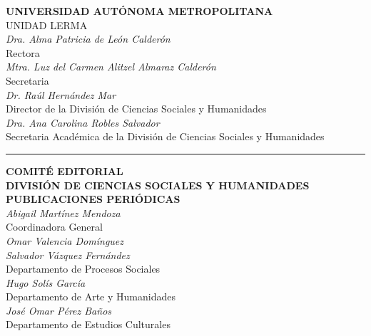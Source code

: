 \clearpage
  \begingroup
    \thispagestyle{empty}
      \begin{center}
        \sffamily\small
        {\montserrat\Large\textbf{UNIVERSIDAD AUTÓNOMA METROPOLITANA}} \\
        {\large UNIDAD LERMA} \\
        \vspace{0.2cm}
        \textit{Dra. Alma Patricia de León Calderón} \\
        Rectora \\
        \vspace{0.3cm}
        {\itshape Mtra. Luz del Carmen Alitzel Almaraz Calderón} \\
        Secretaria \\
        \vspace{0.3cm}
        \textit{Dr. Raúl Hernández Mar} \\
        Director de la División de Ciencias Sociales y Humanidades \\
        \vspace{0.3cm}
        \textit{Dra. Ana Carolina Robles Salvador} \\
        Secretaria Académica de la División de Ciencias Sociales y Humanidades \\
  
        \vspace{0.6cm}
        \rule{0.6\textwidth}{0.4pt}
        \vspace{0.6cm}
  
        {\montserrat\Large\textbf{COMITÉ EDITORIAL}} \\
        {\montserrat\large\textbf{DIVISIÓN DE CIENCIAS SOCIALES Y HUMANIDADES}} \\
        {\montserrat\large\textbf{PUBLICACIONES PERIÓDICAS}} \\
        \vspace{0.4cm}
        \textit{Abigail Martínez Mendoza} \\
        Coordinadora General \\
        \vspace{0.3cm}
        \textit{Omar Valencia Domínguez} \\
        \textit{Salvador Vázquez Fernández} \\
        Departamento de Procesos Sociales \\
        \vspace{0.3cm}
        \textit{Hugo Solís García} \\
        Departamento de Arte y Humanidades \\
        \vspace{0.3cm}
        \textit{José Omar Pérez Baños} \\
        Departamento de Estudios Culturales \\
        

\end{center}
